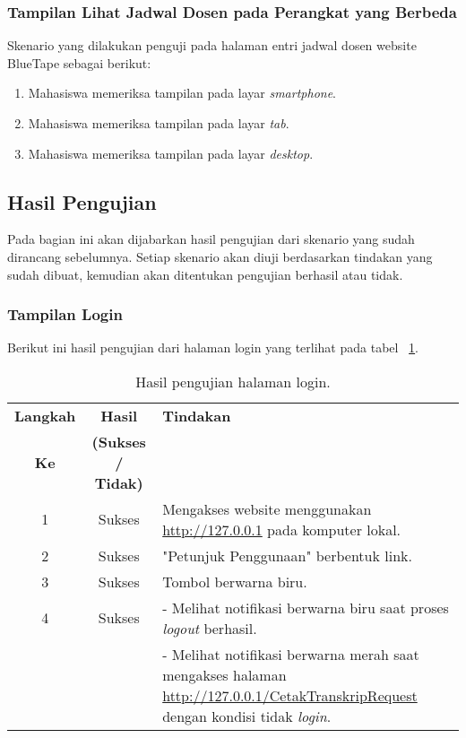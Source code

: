 \subsubsection{Tampilan Lihat Jadwal Dosen pada Perangkat yang Berbeda}
Skenario yang dilakukan penguji pada halaman entri jadwal dosen  website BlueTape sebagai berikut:
\begin{enumerate}
	\item Mahasiswa memeriksa tampilan pada layar \textit{smartphone}. 	
	\item Mahasiswa memeriksa tampilan pada layar \textit{tab}.
	\item Mahasiswa memeriksa tampilan pada layar \textit{desktop}.
\end{enumerate}

\subsection{Hasil Pengujian}
Pada bagian ini akan dijabarkan hasil pengujian dari skenario yang sudah dirancang sebelumnya. Setiap skenario akan diuji berdasarkan tindakan yang sudah dibuat, kemudian akan ditentukan pengujian berhasil atau tidak.
\subsubsection{Tampilan Login}
Berikut ini hasil pengujian dari halaman login yang terlihat pada tabel ~\ref{hasil:Login}.
\begin{table}[H]
	\centering 
	\caption{Hasil pengujian halaman login.}
	\label{hasil:Login}
	\begin{tabular}{|c|c|p{}|}
		\toprule
		\textbf{Langkah} & \textbf{Hasil} & \textbf{Tindakan}\\
		\textbf{Ke} & \textbf{(Sukses / Tidak)} & \\		
		\midrule
		1 & Sukses & Mengakses website menggunakan \url{http://127.0.0.1} pada komputer lokal.\\
		\hline
		2 & Sukses & "Petunjuk Penggunaan" berbentuk link.\\
		\hline
		3 & Sukses & Tombol berwarna biru.\\
		\hline									
		\hline
		4 & Sukses & - Melihat notifikasi berwarna biru saat proses \textit{logout} berhasil.\\
		&& - Melihat notifikasi berwarna merah saat mengakses halaman \url{http://127.0.0.1/CetakTranskripRequest} dengan kondisi tidak \textit{login}.\\
		\bottomrule		
	\end{tabular} 
\end{table}

